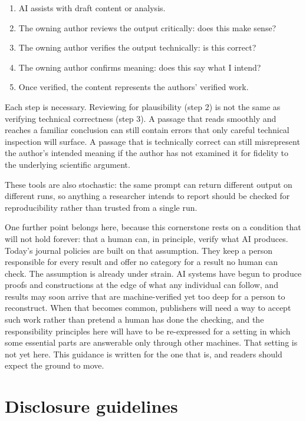 \documentclass{SIAMbook2023}
\begin{document}
\begin{enumerate}
\item AI assists with draft content or analysis.
\item The owning author reviews the output critically: does this make sense?
\item The owning author verifies the output technically: is this correct?
\item The owning author confirms meaning: does this say what I intend?
\item Once verified, the content represents the authors' verified work.
\end{enumerate}

Each step is necessary. Reviewing for plausibility (step 2) is not the same as verifying technical correctness (step 3). A passage that reads smoothly and reaches a familiar conclusion can still contain errors that only careful technical inspection will surface. A passage that is technically correct can still misrepresent the author's intended meaning if the author has not examined it for fidelity to the underlying scientific argument.

These tools are also stochastic: the same prompt can return different output on different runs, so anything a researcher intends to report should be checked for reproducibility rather than trusted from a single run.

One further point belongs here, because this cornerstone rests on a condition that will not hold forever: that a human can, in principle, verify what AI produces. Today's journal policies are built on that assumption. They keep a person responsible for every result and offer no category for a result no human can check. The assumption is already under strain. AI systems have begun to produce proofs and constructions at the edge of what any individual can follow, and results may soon arrive that are machine-verified yet too deep for a person to reconstruct. When that becomes common, publishers will need a way to accept such work rather than pretend a human has done the checking, and the responsibility principles here will have to be re-expressed for a setting in which some essential parts are answerable only through other machines. That setting is not yet here. This guidance is written for the one that is, and readers should expect the ground to move.

\section{Disclosure guidelines}
\end{document}
